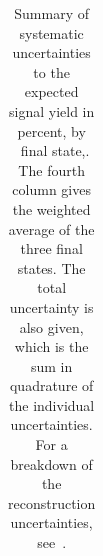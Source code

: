 \begin{table}[htbp]
\begin{tabular}{l c c c c}
   \end{tabular}
   \caption[Systematic uncertainties to expected signal yield.]
   {Summary of systematic uncertainties to the expected signal yield 
   in percent, by \ZZ\ final state,. 
   The fourth column gives the weighted average
   of the three final states. The total uncertainty is also given, which is the
   sum in quadrature of the individual uncertainties. For a breakdown of the
   reconstruction uncertainties,
   see~.} 
   \label{table:objSel-syst-yield}
\end{table}
